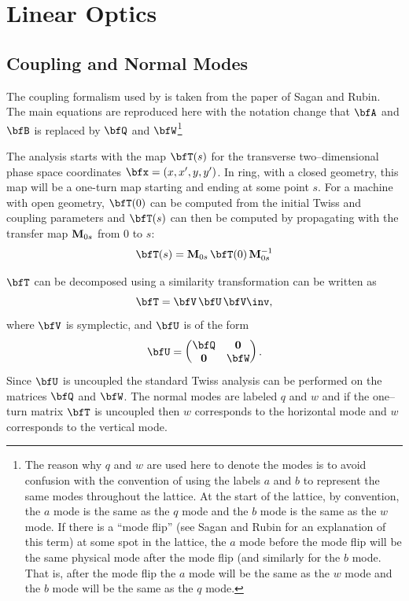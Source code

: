 \chapter{Linear Optics}

\section{Coupling and Normal Modes}
\label{s:coupling}

The coupling formalism used by \bmad is taken from the paper of Sagan and
Rubin\cite{b:coupling}. The main equations are reproduced here with the notation change that $\bfA$
and $\bfB$ is replaced by $\bfQ$ and $\bfW$\footnote{The reason why $q$ and $w$ are used here to
denote the modes is to avoid confusion with the \bmad convention of using the labels $a$ and $b$ to
represent the same modes throughout the lattice. At the start of the lattice, by convention, the $a$
mode is the same as the $q$ mode and the $b$ mode is the same as the $w$ mode. If there is a ``mode
flip'' (see Sagan and Rubin for an explanation of this term) at some spot in the lattice, the $a$
mode before the mode flip will be the same physical mode after the mode flip (and similarly for the
$b$ mode.  That is, after the mode flip the $a$ mode will be the same as the $w$ mode and the $b$
mode will be the same as the $q$ mode.}

The analysis starts with the map $\bfT(s)$ for the transverse two--dimensional phase space coordinates
$\bfx = (x, x', y, y')$. In ring, with a closed geometry, this map will be a one-turn map starting
and ending at some point $s$. For a machine with open geometry, $\bfT(0)$ can be computed from the
initial Twiss and coupling parameters and $\bfT(s)$ can then be computed by propagating with the
transfer map ${\bf M}_{0s}$ from $0$ to $s$:
\begin{equation}
    \bfT(s) = \bfM_{0s} \, \bfT(0) \, \bfM_{0s}^{-1}
\end{equation}

$\bfT$ can be decomposed using a similarity transformation
 can be written as
  \begin{equation}
    \bfT = \bfV \, \bfU \, \bfV\inv 
    , \label{tvuv}
  \end{equation} 
where $\bfV$ is symplectic, and $\bfU$ is of the form
  \begin{equation}
    \bfU = 
    \begin{pmatrix}
      \bfQ & \Bf0 \cr 
      \Bf0 & \bfW \cr
    \end{pmatrix}
    . \label{ua00b}
  \end{equation}
Since $\bfU$ is uncoupled the standard Twiss analysis can be performed on the matrices
$\bfQ$ and $\bfW$. The normal modes are labeled $q$ and $w$ and if the one--turn matrix
$\bfT$ is uncoupled then $w$ corresponds to the horizontal mode and $w$ corresponds to the
vertical mode.

